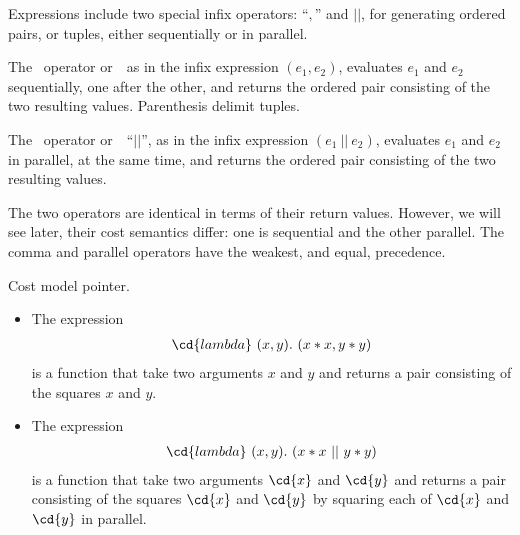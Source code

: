 \begin{cluster}
\label{grp:grm:sparc::sequential-and-parallel-composition}

\begin{gram}
\label{grm:sparc::sequential-and-parallel-composition}
Expressions include two special infix operators: ``$,$'' and
$||$, for generating ordered pairs, or tuples, either
sequentially or in parallel.

The~ operator or~~as in the
infix expression $(e_1, e_2)$, evaluates $e_1$ and
$e_2$ sequentially, one after the other, and returns the ordered pair
consisting of the two resulting values.
Parenthesis delimit  tuples.

The~ operator or~~``$||$'',
as in the infix expression
$(e_1~||~e_2)$,
evaluates $e_1$ and $e_2$ in parallel, at the same time, and
returns the ordered pair consisting of the two resulting values.


The two operators are identical in terms of their return values.
However, we will see later, their cost semantics differ: one is
sequential and the other parallel.  The comma and parallel operators
have the weakest, and equal, precedence.

\end{gram}
\end{cluster}

\begin{cluster}
\label{grp:tch:sparc::cost}

\begin{teachnote}
\label{tch:sparc::cost}
Cost model pointer.

\end{teachnote}
\end{cluster}

\begin{cluster}
\label{grp:xmpl:sparc::expression}

\begin{example}
\label{xmpl:sparc::expression}
\begin{itemize}

\item

The expression 
\[
\begin{array}{l}
\cd{lambda}~(x, y).~(x * x, y * y)
\end{array}
\]
is a function that take two arguments $x$ and $y$ and returns a
pair consisting of the squares $x$ and $y$.

\item
The expression
\[
\begin{array}{l}
\cd{lambda}~(x, y).~(x * x~||~y * y)
\end{array}
\]
is a function that take two arguments $\cd{x}$ and $\cd{y}$ and returns a
pair consisting of the squares $\cd{x}$ and $\cd{y}$ by squaring each of
$\cd{x}$ and $\cd{y}$ in parallel.
\end{itemize}

\end{example}
\end{cluster}

